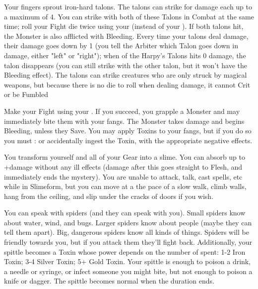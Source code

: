 \MYSTERY [
  Name = Harpy's Talons,
  Link = arcana-mystery-harpys-talons,
  Paradigm = Force,
  Save = n/a,
  Duration = Session,
  Target = Self
]

Your fingers sprout iron-hard talons.  The talons can strike for \DICE damage each up to a maximum of 4.  You can strike with both of these Talons in Combat at the same time; roll your Fight die twice using your \FOC (instead of your \VIG).  If both talons hit, the Monster is also afflicted with Bleeding.  Every time your talons deal damage, their damage goes down by 1 (you tell the Arbiter which Talon goes down in damage, either "left" or "right"); when  of the Harpy's Talons hits 0 damage, the talon disappears (you can still strike with the other talon, but it won't have the Bleeding effect). The talons can strike creatures who are only struck by magical weapons, but because there is no die to roll when dealing damage, it cannot Crit or be Fumbled

\MYSTERY [
  Name = Serpent's Fang,
  Link = arcana-mystery-serpents-fang,
  Paradigm = Biomancy,
  Save = n/a,
  Duration = Combat or \SUM Minutes,
  Target = Self
]

Make your Fight \RO using your \FOC.  If you succeed, you grapple a Monster and may immediately bite them with your fangs.  The Monster takes \DICE damage and begins Bleeding, unless they Save.  You may apply Toxins to your fangs, but if you do so you must \RS : \FOC or accidentally ingest the Toxin, with the appropriate negative effects.

\MYSTERY [
  Name = Slimeform,
  Link = arcana-mystery-slimeform,
  Paradigm = Biomancy,
  Save = n/a,
  Duration = \SUM Minutes,
  Target = Self
]

You transform yourself and all of your Gear into a slime.  You can absorb up to \SUMDICE+\DICE damage without any ill effects (damage after this goes straight to Flesh, and immediately ends the mystery).  You are unable to attack, talk, cast spells, etc while in Slimeform, but you can move at a the pace of a slow walk, climb walls, hang from the ceiling, and slip under the cracks of doors if you wish.

\MYSTERY [
  Name = Spidertongue,
  Link = arcana-mystery-spidertongue,
  Paradigm = Biomancy,
  Save = Y (neg.),
  Duration = Combat or \SUM Minutes,
  Target = Self
]

You can speak with spiders (and they can speak with you).  Small spiders know about water, wind, and bugs.  Larger spiders know about people (maybe they can tell them apart).  Big, dangerous spiders know all kinds of things.  Spiders will be friendly towards you, but if you attack them they'll fight back.  Additionally, your spittle becomes a Toxin whose power depends on the number of \DICE spent: 1-2 \DICE Iron Toxin; 3-4 \DICE Silver Toxin; 5+ \DICE Gold Toxin.  Your spittle is enough to poison a drink, a needle or syringe, or infect someone you might bite, but not enough to poison a knife or dagger.  The spittle becomes normal when the duration ends.


